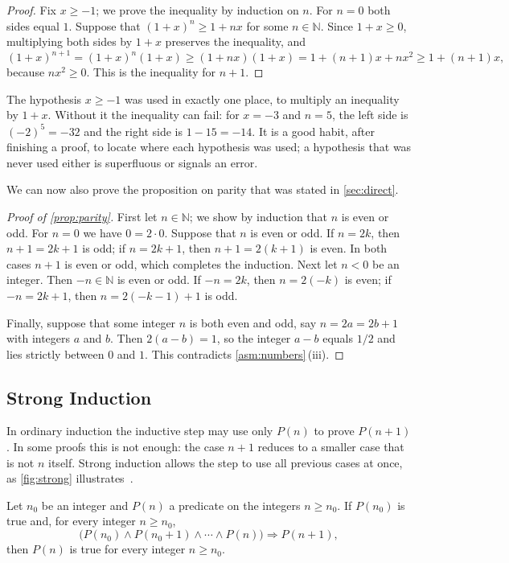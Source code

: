 \begin{proof}
Fix $x\ge-1$; we prove the inequality by induction on $n$. For $n=0$ both sides equal $1$. Suppose that $(1+x)^n\ge1+nx$ for some $n\in\mathbb N$. Since $1+x\ge0$, multiplying both sides by $1+x$ preserves the inequality, and
\[
(1+x)^{n+1}=(1+x)^n(1+x)\ge(1+nx)(1+x)=1+(n+1)x+nx^2\ge1+(n+1)x,
\]
because $nx^2\ge0$. This is the inequality for $n+1$.
\end{proof}

The hypothesis $x\ge-1$ was used in exactly one place, to multiply an inequality by $1+x$. Without it the inequality can fail: for $x=-3$ and $n=5$, the left side is $(-2)^5=-32$ and the right side is $1-15=-14$. It is a good habit, after finishing a proof, to locate where each hypothesis was used; a hypothesis that was never used either is superfluous or signals an error.

We can now also prove the proposition on parity that was stated in \cref{sec:direct}.

\begin{proof}[Proof of \cref{prop:parity}]
First let $n\in\mathbb N$; we show by induction that $n$ is even or odd. For $n=0$ we have $0=2\cdot0$. Suppose that $n$ is even or odd. If $n=2k$, then $n+1=2k+1$ is odd; if $n=2k+1$, then $n+1=2(k+1)$ is even. In both cases $n+1$ is even or odd, which completes the induction. Next let $n<0$ be an integer. Then $-n\in\mathbb N$ is even or odd. If $-n=2k$, then $n=2(-k)$ is even; if $-n=2k+1$, then $n=2(-k-1)+1$ is odd.

Finally, suppose that some integer $n$ is both even and odd, say $n=2a=2b+1$ with integers $a$ and $b$. Then $2(a-b)=1$, so the integer $a-b$ equals $1/2$ and lies strictly between $0$ and $1$. This contradicts \cref{asm:numbers}\,(iii).
\end{proof}

\subsection{Strong Induction}

In ordinary induction the inductive step may use only $P(n)$ to prove $P(n+1)$. In some proofs this is not enough: the case $n+1$ reduces to a smaller case that is not $n$ itself. Strong induction allows the step to use all previous cases at once, as \cref{fig:strong} illustrates~\cite{velleman2019}.

\begin{theorem}
\label{thm:strong-induction}
Let $n_0$ be an integer and $P(n)$ a predicate on the integers $n\ge n_0$. If $P(n_0)$ is true and, for every integer $n\ge n_0$,
\[
\bigl(P(n_0)\wedge P(n_0+1)\wedge\cdots\wedge P(n)\bigr)\Rightarrow P(n+1),
\]
then $P(n)$ is true for every integer $n\ge n_0$.
\end{theorem}

